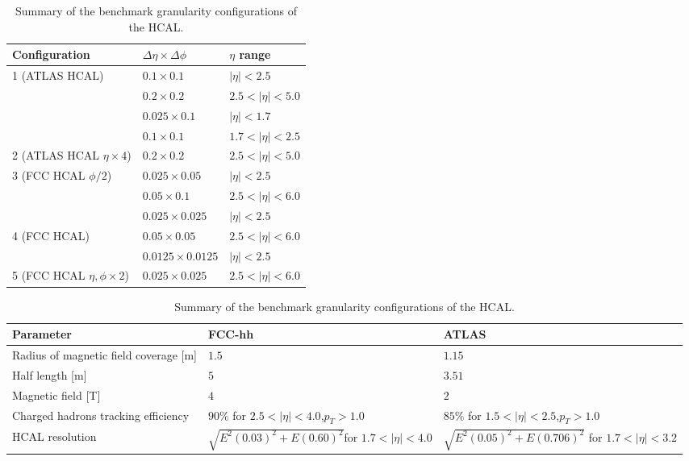 \begin{table}
	\centering
	\begin{tabular}{lll}
		\toprule 
		\textbf{Configuration} & $\Delta \eta \times \Delta \phi$ & $\eta$ range\\
		\midrule
		\multirow{2}{*}{1 (ATLAS HCAL)} & $0.1\times 0.1$  & $|\eta|<2.5$\\
		& $0.2\times 0.2$ & $2.5<|\eta|<5.0$ \\
		\cellcolor{black!7} &\cellcolor{black!7} $0.025\times 0.1$  & \cellcolor{black!7}$|\eta|<1.7$\\
		\cellcolor{black!7} & \cellcolor{black!7}$0.1\times 0.1$  & \cellcolor{black!7}$1.7<|\eta|<2.5$\\
		\multirow{-3}{*}{2 (ATLAS HCAL $\eta\times 4$)} \cellcolor{black!7}& \cellcolor{black!7}$0.2\times 0.2$  &\cellcolor{black!7} $2.5<|\eta|<5.0$\\
		\multirow{2}{*}{3 (FCC HCAL $\phi/2 $)}& $0.025\times0.05$ & $|\eta|<2.5$\\
		& $0.05\times 0.1$ & $2.5<|\eta|<6.0$ \\
		 \cellcolor{black!7}&  \cellcolor{black!7}$0.025\times0.025$ &  \cellcolor{black!7}$|\eta|<2.5$\\
		 \multirow{-2}{*}{4 (FCC HCAL)}\cellcolor{black!7}&  \cellcolor{black!7}$0.05\times 0.05$ & \cellcolor{black!7} $2.5<|\eta|<6.0$ \\
		& $0.0125\times0.0125$ &$|\eta|<2.5$\\
		\multirow{-2}{*}{5 (FCC HCAL $\eta,\phi\times 2$)}&$0.025\times 0.025$ & $2.5<|\eta|<6.0$\\
		\bottomrule
	\end{tabular}
	\caption{Summary of the benchmark granularity configurations of the HCAL.}
	\label{table:Gran}
\end{table}

\begin{table}
	\centering
	\begin{tabular}{p{40mm}p{40mm}p{40mm}}
		\toprule 
		\textbf{Parameter} & FCC-hh & ATLAS\\
		\midrule
		Radius of magnetic field coverage [m]& $1.5$& $1.15$  \\
		\cellcolor{black!7}Half length [m] &\cellcolor{black!7} $5$&\cellcolor{black!7} $3.51$\\
		Magnetic field [T]& $4$& $2$\\
		\cellcolor{black!7}Charged hadrons tracking efficiency &\cellcolor{black!7} $90\%$ for $2.5<|\eta|<4.0$,\linebreak$ p_T>1.0$&\cellcolor{black!7} $85\%$ for $1.5<|\eta|<2.5$,\linebreak$p_T>1.0$\\
		HCAL resolution & $\sqrt{E^2(0.03)^2+E(0.60)^2}$\linebreak for $1.7<|\eta|<4.0$& $\sqrt{E^2(0.05)^2+E(0.706)^2}$ \linebreak for $1.7<|\eta|<3.2$\\
		\bottomrule
	\end{tabular}
	\caption{Summary of the benchmark granularity configurations of the HCAL.}
	\label{table:det}
\end{table}

